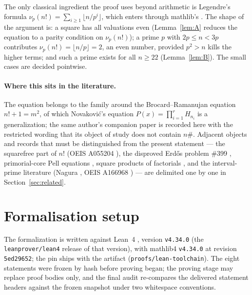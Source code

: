 \documentclass[11pt]{article}
\theoremstyle{definition}
\begin{document}
The only classical ingredient the proof uses beyond arithmetic is Legendre's
formula $\nu_p(n!) = \sum_{i \ge 1} \lfloor n/p^{i} \rfloor$, which enters
through mathlib's . The shape of the
argument is: a square has all valuations even (Lemma~\ref{lem:A} reduces the
equation to a parity condition on $\nu_p(n!)$); a prime $p$ with
$2p \le n < 3p$ contributes $\nu_p(n!) = \lfloor n/p \rfloor = 2$, an even
number, provided $p^2 > n$ kills the higher terms; and such a prime exists
for all $n \ge 22$ (Lemma~\ref{lem:B}). The small cases are decided
pointwise.

\paragraph{Where this sits in the literature.} The equation belongs to the
family around the Brocard--Ramanujan equation $n! + 1 = m^2$, of which
Novakovi\'c's equation $P(x) = \prod_{i=1}^{r} H_{n_i}$
\cite{novakovic2026} is a generalization; the same author's companion paper
\cite{novakovic2026b} is recorded here with the restricted wording that its
object of study does not contain $n\#$. Adjacent objects and records that
must be distinguished from the present statement --- the squarefree part of
$n!$ (OEIS A055204 \cite{oeisA055204}), the disproved Erd\H{o}s problem
\#399 \cite{erdos399}, primorial-core Pell equations \cite{peixoto2026},
square products of factorials \cite{yudin2026}, and the interval-prime
literature (Nagura \cite{nagura1952}, OEIS A166968 \cite{oeisA166968}) ---
are delimited one by one in Section~\ref{sec:related}.

\section{Formalisation setup}\label{sec:setup}

The formalization is written against Lean~4 \cite{lean4}, version
\texttt{v4.34.0} (the \texttt{leanprover/lean4} release of that version),
with mathlib4 \cite{mathlib} \texttt{v4.34.0} at revision \texttt{5ed29652};
the pin ships with the artifact (\texttt{proofs/lean-toolchain}). The eight
statements were frozen by hash before proving began; the proving stage may
replace proof bodies only, and the final audit re-compares the delivered
statement headers against the frozen snapshot under two whitespace
conventions.
\end{document}
